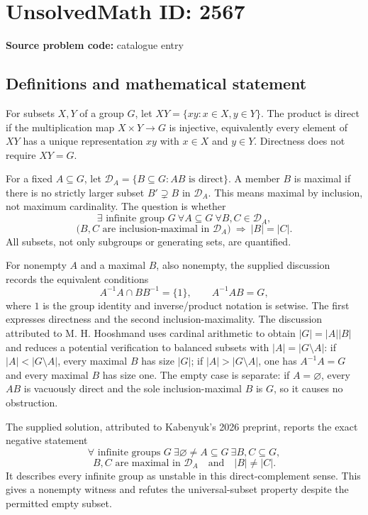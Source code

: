 \documentclass[11pt]{article}
\begin{document}
\section*{UnsolvedMath ID: 2567}
\textbf{Source problem code:} catalogue entry
\subsection{Definitions and mathematical statement}
For subsets $X,Y$ of a group $G$, let $XY=\{xy:x\in X,y\in Y\}$. The product is direct if the multiplication map $X\times Y\to G$ is injective, equivalently every element of $XY$ has a unique representation $xy$ with $x\in X$ and $y\in Y$. Directness does not require $XY=G$.

For a fixed $A\subseteq G$, let $\mathcal D_A=\{B\subseteq G:AB\text{ is direct}\}$. A member $B$ is maximal if there is no strictly larger subset $B'\supsetneq B$ in $\mathcal D_A$. This means maximal by inclusion, not maximum cardinality. The question is whether
\[
\exists\text{ infinite group }G\ \forall A\subseteq G\ \forall B,C\in\mathcal D_A,
\]
\[
\bigl(B,C\text{ are inclusion-maximal in }\mathcal D_A\bigr)
\ \Longrightarrow\ |B|=|C|.
\]
All subsets, not only subgroups or generating sets, are quantified.

For nonempty $A$ and a maximal $B$, also nonempty, the supplied discussion records the equivalent conditions
\[
A^{-1}A\cap BB^{-1}=\{1\},\qquad A^{-1}AB=G,
\]
where $1$ is the group identity and inverse/product notation is setwise. The first expresses directness and the second inclusion-maximality. The discussion attributed to M. H. Hooshmand uses cardinal arithmetic to obtain $|G|=|A||B|$ and reduces a potential verification to balanced subsets with $|A|=|G\setminus A|$: if $|A|<|G\setminus A|$, every maximal $B$ has size $|G|$; if $|A|>|G\setminus A|$, one has $A^{-1}A=G$ and every maximal $B$ has size one. The empty case is separate: if $A=\varnothing$, every $AB$ is vacuously direct and the sole inclusion-maximal $B$ is $G$, so it causes no obstruction.

The supplied solution, attributed to Kabenyuk's 2026 preprint, reports the exact negative statement
\[
\forall\text{ infinite groups }G\ \exists\varnothing\ne A\subseteq G\ \exists B,C\subseteq G,
\]
\[
B,C\text{ are maximal in }\mathcal D_A\quad\text{and}\quad |B|\ne|C|.
\]
It describes every infinite group as unstable in this direct-complement sense. This gives a nonempty witness and refutes the universal-subset property despite the permitted empty subset.
\end{document}
